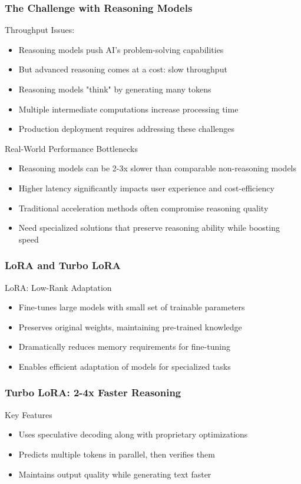 \documentclass[aspectratio=169]{beamer}
\begin{document}
\begin{frame}
	\frametitle{The Challenge with Reasoning Models}
	\begin{block}{Throughput Issues:}
		\begin{itemize}
			\item Reasoning models push AI's problem-solving capabilities
			\item But advanced reasoning comes at a cost: slow throughput
			\item Reasoning models "think" by generating many tokens
			\item Multiple intermediate computations increase processing time
			\item Production deployment requires addressing these challenges
		\end{itemize}
	\end{block}
	\begin{block}{Real-World Performance Bottlenecks}
		\begin{itemize}
			\item Reasoning models can be 2-3x slower than comparable non-reasoning models
			\item Higher latency significantly impacts user experience and cost-efficiency
			\item Traditional acceleration methods often compromise reasoning quality
			\item Need specialized solutions that preserve reasoning ability while boosting speed
		\end{itemize}
	\end{block}
\end{frame}

\begin{frame}
	\frametitle{LoRA and Turbo LoRA}
	\begin{block}{LoRA: Low-Rank Adaptation}
		\begin{itemize}
			\item Fine-tunes large models with small set of trainable parameters
			\item Preserves original weights, maintaining pre-trained knowledge
			\item Dramatically reduces memory requirements for fine-tuning
			\item Enables efficient adaptation of models for specialized tasks
		\end{itemize}
	\end{block}
\end{frame}

\begin{frame}[shrink=15]
	\frametitle{Turbo LoRA: 2-4x Faster Reasoning}
	\begin{block}{Key Features}
		\begin{itemize}
			\item Uses speculative decoding along with proprietary optimizations
			\item Predicts multiple tokens in parallel, then verifies them
			\item Maintains output quality while generating text faster
		\end{itemize}
	\end{block}
\end{frame}
\end{document}
